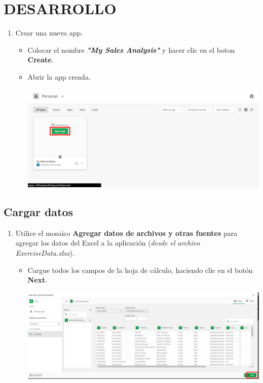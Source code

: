 \documentclass[12pt,letterpaper]{article}
\newcommand\tab[1][1cm]{\hspace*{#1}}
\begin{document}
    \section{DESARROLLO}
    \begin{enumerate}[\tab 1.]
        \item Crear una nueva app.
        \begin{itemize}
            \item Colocar el nombre \textit{\textbf{"My Sales Analysis"}} y hacer clic en el boton \textbf{Create}.
            \item Abrir la app creada.
            \begin{center}
                \includegraphics[width=13cm]{./img/img1.png}
            \end{center}
        \end{itemize}
    \end{enumerate}
    
    \subsection{Cargar datos}
    \begin{enumerate}[\tab 1.]
        \item Utilice el mosaico \textbf{Agregar datos de archivos y otras fuentes} para agregar los datos del Excel a la aplicación (\textit{desde el archivo ExerciseData.xlsx}).
        \begin{itemize}
            \item Cargue todos los campos de la hoja de cálculo, haciendo clic en el botón \textbf{Next}.
            \begin{center}
                \includegraphics[width=13cm]{./img/img2.png}
            \end{center}
        \end{itemize}
    \end{enumerate}
    
\end{document}
